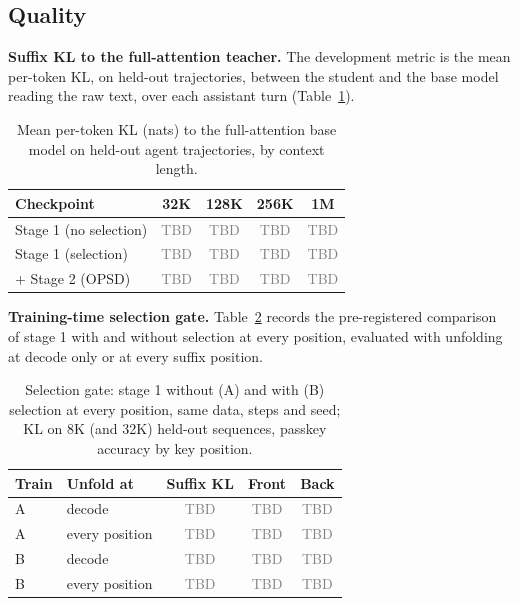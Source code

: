 \documentclass[10pt,twocolumn]{article}
\newcommand{\para}[1]{\noindent\textbf{#1}\hspace{0.5em}}
\newcommand{\tbd}{\textcolor{gray}{TBD}}
\begin{document}
\subsection{Quality}
\label{sec:quality}


\para{Suffix KL to the full-attention teacher.}
The development metric is the mean per-token KL, on held-out trajectories, between the student
and the base model reading the raw text, over each assistant turn (Table~\ref{tab:kl}).

\begin{table}[t]
\caption{Mean per-token KL (nats) to the full-attention base model on held-out agent
trajectories, by context length.}
\label{tab:kl}
\centering\small
\begin{tabular}{lcccc}
\toprule
Checkpoint & 32K & 128K & 256K & 1M \\
\midrule
Stage 1 (no selection) & \tbd & \tbd & \tbd & \tbd \\
Stage 1 (selection) & \tbd & \tbd & \tbd & \tbd \\
+ Stage 2 (OPSD) & \tbd & \tbd & \tbd & \tbd \\
\bottomrule
\end{tabular}
\end{table}

\para{Training-time selection gate.}
Table~\ref{tab:gate} records the pre-registered comparison of stage 1 with and without
selection at every position, evaluated with unfolding at decode only or at every suffix
position.

\begin{table}[t]
\caption{Selection gate: stage 1 without (A) and with (B) selection at every position, same
data, steps and seed; KL on 8K (and 32K) held-out sequences, passkey accuracy by key position.}
\label{tab:gate}
\centering\small
\begin{tabular}{llccc}
\toprule
Train & Unfold at & Suffix KL & Front & Back \\
\midrule
A & decode & \tbd & \tbd & \tbd \\
A & every position & \tbd & \tbd & \tbd \\
B & decode & \tbd & \tbd & \tbd \\
B & every position & \tbd & \tbd & \tbd \\
\bottomrule
\end{tabular}
\end{table}
\end{document}
